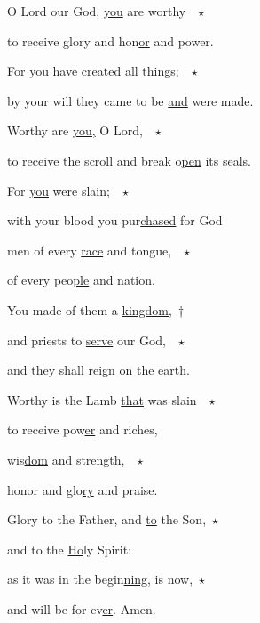 \noindent O Lord our God, \uline{you} are worthy ~$\star$~\nopagebreak

to receive glory and hon\uline{or} and power.

\noindent For you have creat\uline{ed} all things; ~$\star$~\nopagebreak

by your will they came to be \uline{and} were made.

\noindent Worthy are \uline{you,} O Lord, ~$\star$~\nopagebreak

to receive the scroll and break o\uline{pen} its seals.

\noindent For \uline{you} were slain; ~$\star$~\nopagebreak

with your blood you pur\uline{chased} for God

\noindent men of every \uline{race} and tongue, ~$\star$~\nopagebreak

of every peo\uline{ple} and nation.

\noindent You made of them a \uline{kingdom},~†~\nopagebreak

and priests to \uline{serve} our God, ~$\star$~\nopagebreak

and they shall reign \uline{on} the earth.

\noindent Worthy is the Lamb \uline{that} was slain ~$\star$~\nopagebreak

to receive pow\uline{er} and riches,

\noindent wis\uline{dom} and strength, ~$\star$~\nopagebreak

honor and glo\uline{ry} and praise.

\noindent Glory to the Father, and \uline{to} the Son,~$\star$~\nopagebreak

and to the \uline{Ho}ly Spirit:

\noindent as it was in the begin\uline{ning}, is now,~$\star$~\nopagebreak

and will be for ev\uline{er}. Amen.
